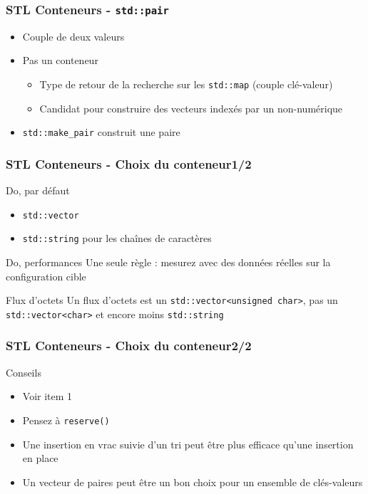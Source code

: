 \documentclass[C++.tex]{subfiles}
\begin{document}
\begin{frame}
	\frametitle{STL Conteneurs - \lstinline|std::pair|}
	\begin{itemize}
		\item Couple de deux valeurs
		\item Pas un conteneur
		\begin{itemize}
			\item Type de retour de la recherche sur les \lstinline|std::map| (couple clé-valeur)
			\item Candidat pour construire des vecteurs indexés par un non-numérique
		\end{itemize}
		\item \lstinline|std::make_pair| construit une paire
	\end{itemize}
\end{frame}

\begin{frame}
	\frametitle{STL Conteneurs - Choix du conteneur\titlehfill{}1/2}
	\begin{exampleblock}{Do, par défaut}
		\begin{itemize}
			\item \lstinline|std::vector|
			\item \lstinline|std::string| pour les chaînes de caractères
		\end{itemize}
	\end{exampleblock}		

	\begin{exampleblock}{Do, performances}
		Une seule règle : mesurez avec des données réelles sur la configuration cible
	\end{exampleblock}

	\begin{alertblock}{Flux d'octets}
		Un flux d'octets est un \lstinline|std::vector<unsigned char>|, pas un \lstinline|std::vector<char>| et encore moins \lstinline|std::string|
	\end{alertblock}
\end{frame}

\begin{frame}
	\frametitle{STL Conteneurs - Choix du conteneur\titlehfill{}2/2}
	\begin{block}{Conseils}
		\begin{itemize}
			\item Voir \cite{effStl} item 1
			\item Pensez à \lstinline|reserve()|
			\item Une insertion \og en vrac\fg{} suivie d'un tri peut être plus efficace qu'une insertion en place


			\item Un vecteur de paires peut être un bon choix pour un ensemble de clés-valeurs

		\end{itemize}
	\end{block}
\end{frame}
\end{document}
